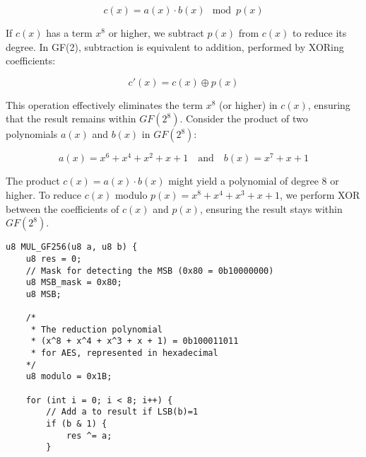 \begin{itemize}
\begin{note}
\begin{itemize}
				\[
				c(x) = a(x) \cdot b(x) \mod p(x)
				\]
				
				If \( c(x) \) has a term \( x^8 \) or higher, we subtract \( p(x) \) from \( c(x) \) to reduce its degree. In GF(2), subtraction is equivalent to addition, performed by XORing coefficients:
				
				\[
				c'(x) = c(x) \oplus p(x)
				\]
				
				This operation effectively eliminates the term \( x^8 \) (or higher) in \( c(x) \), ensuring that the result remains within $GF(2^8)$.
					Consider the product of two polynomials \( a(x) \) and \( b(x) \) in $GF(2^8)$:
					
					\[
					a(x) = x^6 + x^4 + x^2 + x + 1 \quad \text{and} \quad b(x) = x^7 + x + 1
					\]
					
					The product \( c(x) = a(x) \cdot b(x) \) might yield a polynomial of degree 8 or higher. To reduce \( c(x) \) modulo \( p(x) = x^8 + x^4 + x^3 + x + 1 \), we perform XOR between the coefficients of \( c(x) \) and \( p(x) \), ensuring the result stays within $GF(2^8)$.
	\end{itemize}
	
%		
%		
%		
%		

%		
%		

%		
%		

\end{note}

	\newpage
	\begin{lstlisting}[style=C, caption={Multiplication in GF($2^8$)},captionpos=t]
u8 MUL_GF256(u8 a, u8 b) {
	u8 res = 0;
	// Mask for detecting the MSB (0x80 = 0b10000000)
	u8 MSB_mask = 0x80;
	u8 MSB;
	
	/*
	 * The reduction polynomial
	 * (x^8 + x^4 + x^3 + x + 1) = 0b100011011
	 * for AES, represented in hexadecimal
	*/
	u8 modulo = 0x1B;
	
	for (int i = 0; i < 8; i++) {
		// Add a to result if LSB(b)=1
		if (b & 1) {
			res ^= a;
		}
		

\end{lstlisting}
\end{itemize}
